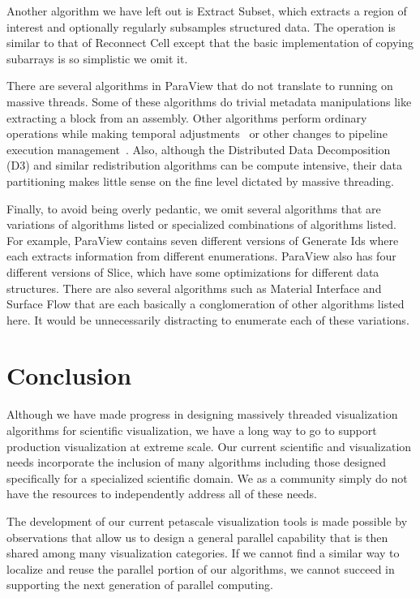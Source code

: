 \documentclass{sig-alternate}
\newcommand*{\lcite}[1]{~\cite{#1}}
\newcommand{\algclass}[1]{\textsf{#1}}
\newcommand{\alg}[1]{#1}
\begin{document}
Another algorithm we have left out is \alg{Extract Subset}, which extracts
a region of interest and optionally regularly subsamples structured
data. The operation is similar to that of \algclass{Reconnect Cell} except
that the basic implementation of copying subarrays is so simplistic we omit
it.

There are several algorithms in ParaView that do not translate to running
on massive threads. Some of these algorithms do trivial metadata
manipulations like extracting a block from an assembly. Other algorithms
perform ordinary operations while making temporal
adjustments\lcite{Biddiscombe2007} or other changes to pipeline execution
management\lcite{Moreland2013:TVCG}. Also, although the \alg{Distributed
  Data Decomposition} (\alg{D3}) and similar redistribution algorithms can
be compute intensive, their data partitioning makes little sense on the
fine level dictated by massive threading.

Finally, to avoid being overly pedantic, we omit several algorithms that
are variations of algorithms listed or specialized combinations of
algorithms listed. For example, ParaView contains seven different versions
of \alg{Generate Ids} where each extracts information from different
enumerations. ParaView also has four different versions of \alg{Slice},
which have some optimizations for different data structures. There are also
several algorithms such as \alg{Material Interface} and \alg{Surface Flow}
that are each basically a conglomeration of other algorithms listed here.
It would be unnecessarily distracting to enumerate each of these
variations.


\section{Conclusion}
\label{sec:Conclusion}

\noindent
Although we have made progress in designing massively threaded
visualization algorithms for scientific visualization, we have a long way
to go to support production visualization at extreme scale. Our current
scientific and visualization needs incorporate the inclusion of many
algorithms including those designed specifically for a specialized
scientific domain. We as a community simply do not have the resources to
independently address all of these needs.

The development of our current petascale visualization tools is made
possible by observations that allow us to design a general parallel
capability that is then shared among many visualization categories. If we
cannot find a similar way to localize and reuse the parallel portion of our
algorithms, we cannot succeed in supporting the next generation of parallel
computing.
\end{document}
